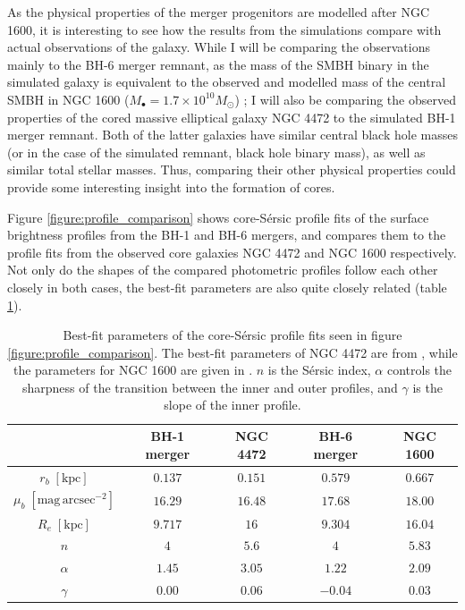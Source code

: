 \documentclass[english, twoside]{HYgradu}
\begin{document}
As the physical properties of the merger progenitors are modelled after NGC 1600, it is interesting to see how the results from the simulations compare with actual observations of the galaxy. While I will be comparing the observations mainly to the BH-6 merger remnant, as the mass of the SMBH binary in the simulated galaxy is equivalent to the observed and modelled mass of the central SMBH in NGC 1600 ($M_\bullet = 1.7 \times 10^{10} M_\odot$) \citep{Thomas2016}; I will also be comparing the observed properties of the cored massive elliptical galaxy NGC 4472 to the simulated BH-1 merger remnant. Both of the latter galaxies have similar central black hole masses (or in the case of the simulated remnant, black hole binary mass), as well as similar total stellar masses. Thus, comparing their other physical properties could provide some interesting insight into the formation of cores.

Figure \ref{figure:profile_comparison} shows core-Sérsic profile fits of the surface brightness profiles from the BH-1 and BH-6 mergers, and compares them to the profile fits from the observed core galaxies NGC 4472 and NGC 1600 respectively. Not only do the shapes of the compared photometric profiles follow each other closely in both cases, the best-fit parameters are also quite closely related (table \ref{table:bestfit_parameter_comparison}). 

\begin{table}
	\begin{center}
		\scriptsize
		\begin{tabular}{| c | c c | c c |}
		\hline
		 & BH-1 merger & NGC 4472 & BH-6 merger & NGC 1600 \\
		\hline
		$r_b \; \mathrm{[kpc]}$ & $0.137$ & $0.151$ & $0.579$ & $0.667$ \\
		$\mu_b \; \mathrm{[mag \, arcsec^{-2}]}$ & $16.29$ & $16.48$ & $17.68$ & $18.00$ \\
		$R_e \; \mathrm{[kpc]}$ & $9.717$ & $16$ & $9.304$ & $16.04$ \\
		$n$ & $4$ & $5.6$ & $4$ & $5.83$ \\
		$\alpha$ & $1.45$ & $3.05$ & $1.22$ & $2.09$ \\
		$\gamma$ & $0.00$ & $0.06$ & $-0.04$ & $0.03$ \\
		\hline
		\end{tabular}
	\end{center}
	\caption{Best-fit parameters of the core-Sérsic profile fits seen in figure \ref{figure:profile_comparison}. The best-fit parameters of NGC 4472 are from \cite{Rusli2013}, while the parameters for NGC 1600 are given in \cite{Thomas2016}. $n$ is the Sérsic index, $\alpha$ controls the sharpness of the transition between the inner and outer profiles, and $\gamma$ is the slope of the inner profile.}
	\label{table:bestfit_parameter_comparison}
\end{table}
\end{document}
